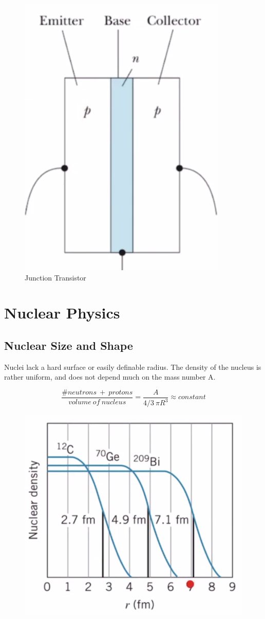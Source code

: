 \documentclass[class=article,crop=false]{standalone}
\begin{document}
\begin{figure}[h!]
	\centering
	\includegraphics[width=.4\linewidth]{./Images/pnp.png}
	\caption{Junction Transistor}
\end{figure}

\newpage
\section{Nuclear Physics}

\subsection{Nuclear Size and Shape}
Nuclei lack a hard surface or easily definable radius. The density of the nucleus is rather uniform, and does not depend much on the mass number A.

$$ \frac{\# neutrons\ +\ protons}{volume\ of\ nucleus} = \frac{A}{4/3\ \pi R^3} \approx constant $$

\begin{figure}[h!]
	\centering
	\includegraphics[width=.6\linewidth]{./Images/nuclear_radius.png}
	\caption{}
\end{figure}
\end{document}
